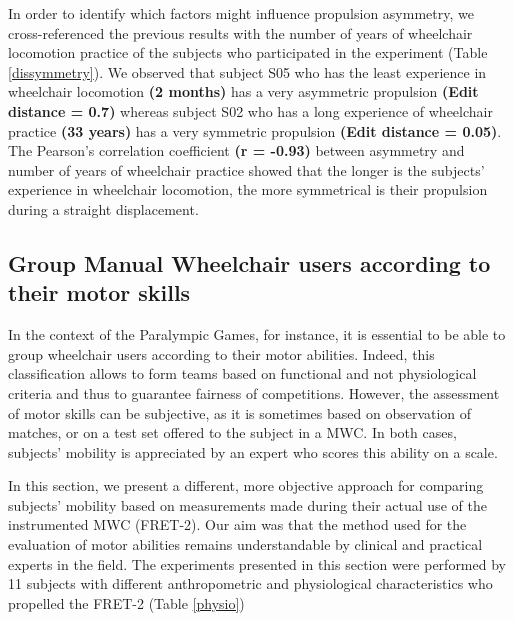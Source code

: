 In order to identify which factors might influence propulsion asymmetry, we cross-referenced the previous results with the number of years of wheelchair locomotion practice of the subjects who participated in the experiment (Table \ref{dissymmetry}). We observed that subject S05 who has the least experience in wheelchair locomotion \textbf{(2 months)} has a very asymmetric propulsion \textbf{(Edit distance = 0.7)} whereas subject S02 who has a long experience of wheelchair practice \textbf{(33 years)} has a very symmetric propulsion \textbf{(Edit distance = 0.05)}. The Pearson's correlation coefficient \textbf{(r = -0.93)} between asymmetry and number of years of wheelchair practice showed that the longer is the subjects' experience in wheelchair locomotion, the more symmetrical is their propulsion during a straight displacement.


\subsection{Group Manual Wheelchair users according to their motor skills}

In the context of the Paralympic Games, for instance, it is essential to be able to group wheelchair users according to their motor abilities. Indeed, this classification allows to form teams based on functional and not physiological criteria and thus to guarantee fairness of competitions. However, the assessment of motor skills can be subjective, as it is sometimes based on observation of matches, or on a test set offered to the subject in a MWC. In both cases, subjects' mobility is appreciated by an expert who scores this ability on a scale.


In this section, we present a different, more objective approach for comparing subjects' mobility based on measurements made during their actual use of the instrumented MWC (FRET-2). Our aim was that the method used for the evaluation of motor abilities remains understandable by clinical and practical experts in the field. The experiments presented in this section were performed by 11 subjects with different anthropometric and physiological characteristics who propelled the FRET-2 (Table \ref{physio})


